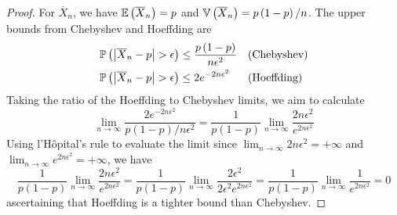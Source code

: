 \documentclass[a4paper]{article}
\begin{document}
\begin{proof}[Proof] 
For \(\overline{X}_{n}\), we have \(\mathbb{E}\left( \overline{X}_{n} \right) = p\) and \(\mathbb{V}\left( \overline{X}_{n} \right) = p \left( 1-p \right) / n\). The upper bounds from Chebyshev and Hoeffding are
\begin{align*}
	\Prob\left( \abs{\overline{X}_{n} - p} > \epsilon  \right) & \le \frac{p \left( 1-p \right) }{n \epsilon^{2}} &&\text{(Chebyshev)} \\
	\Prob\left( \abs{\overline{X}_{n} - p} > \epsilon  \right) & \le 2 e^{-2n \epsilon^{2}}  &&\text{(Hoeffding)} \\ 
\end{align*}
Taking the ratio of the Hoeffding to Chebyshev limits, we aim to calculate
\[
	\lim_{n \to \infty} \frac{2 e^{-2n \epsilon^{2}}}{p(1-p) / n \epsilon^{2}} = \frac{1}{p \left( 1-p \right) }\lim_{n \to \infty} \frac{2n \epsilon^{2}}{e^{2n \epsilon^{2}}}
\]
Using l'H\^{o}pital's rule to evaluate the limit since \(\lim_{n \to \infty} 2n \epsilon^{2} = +\infty\) and \(\lim_{n \to \infty} e^{2n \epsilon^{2}} = +\infty\), we have
\[
\frac{1}{p \left( 1-p \right) } \lim_{n \to \infty} \frac{2n \epsilon^{2}}{e^{2n \epsilon^{2}}} = \frac{1}{p \left( 1-p \right)} \lim_{n \to \infty} \frac{2 \epsilon^{2}}{2 \epsilon^{2} e^{2n \epsilon^{2}}} = \frac{1}{p \left( 1-p \right)} \lim_{n \to \infty} \frac{1}{e^{2n \epsilon^{2}}} = 0
\]
ascertaining that Hoeffding is a tighter bound than Chebyshev.
\end{proof}
\end{document}
